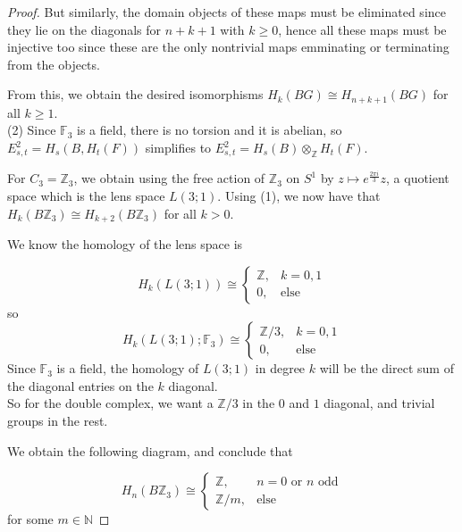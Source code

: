 \documentclass[reqno]{amsart}
\theoremstyle{definition}
\theoremstyle{remark}
\begin{document}
\begin{proof}
But similarly, the domain objects of these maps
must be eliminated since they lie on
the diagonals for $n+k+1$ with $k\ge 0$, hence
all these maps must be injective too since these are
the only nontrivial maps emminating or terminating from
the objects.

From this, we obtain the desired isomorphisms
$H_k (BG) \cong H_{n+k+1}(BG)$ for all
$k\ge 1$.\\
\linebreak
(2) Since $\mathbb{F}_3$ is a field, there is no torsion and
it is abelian,
so $E_{s,t}^2 = 
H_s \left( B, H_t(F) \right) $ simplifies
to $E_{s,t}^2 =
H_s(B) \otimes_{\mathbb{Z}} H_t(F)$.

For $C_3 = \mathbb{Z}_3$, we obtain using the
free action of $\mathbb{Z}_3$ on
$S^{1}$ by
$z \mapsto e^{\frac{2 \pi i}{3}} z$, a
quotient space which is the lens space
$L(3;1) $.
Using (1), we now have that
$H_k(B\mathbb{Z}_3) \cong
H_{k+2}(B\mathbb{Z}_3)$ for all $k>0$.


We know the homology
of the lens space is

\[
H_k \left( L(3;1) \right) 
\cong 
\begin{cases}
    \mathbb{Z},& k=0,1\\
    0,& \text{else}
\end{cases}
\] 
so
\[
H_k \left( L(3;1); \mathbb{F}_3 \right) 
\cong
\begin{cases}
    \mathbb{Z} /3,& k=0,1\\
    0,& \text{else}
\end{cases}
\] 
Since $\mathbb{F}_3$ is a field,
the homology of
$L(3;1)$ in degree $k$ will be the direct sum of the diagonal entries
on the $k$ diagonal.\\
So for the double complex, we want
a $\mathbb{Z}/3$ in the $0$ and $1$ diagonal, and trivial groups
in the rest.

We obtain the following diagram, and conclude that

 \[
H_n\left( B\mathbb{Z}_3 \right) 
\cong
\begin{cases}
    \mathbb{Z},& n=0 \text{ or } n \text{ odd}\\
    \mathbb{Z}/m,& \text{else}
\end{cases}
\] 
for some $m \in \mathbb{N}$




\end{proof}
\end{document}
